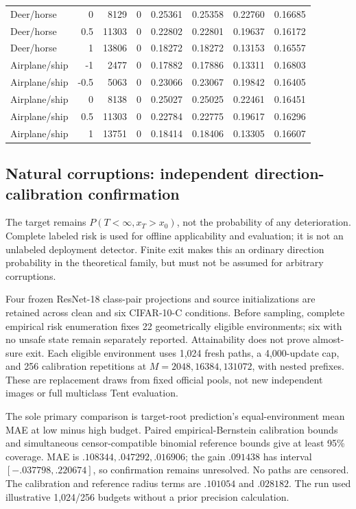 \begin{longtable}{lrrrrrrr}
Deer/horse & 0 & 8129 & 0 & 0.25361 & 0.25358 & 0.22760 & 0.16685 \\
Deer/horse & 0.5 & 11303 & 0 & 0.22802 & 0.22801 & 0.19637 & 0.16172 \\
Deer/horse & 1 & 13806 & 0 & 0.18272 & 0.18272 & 0.13153 & 0.16557 \\
Airplane/ship & -1 & 2477 & 0 & 0.17882 & 0.17886 & 0.13311 & 0.16803 \\
Airplane/ship & -0.5 & 5063 & 0 & 0.23066 & 0.23067 & 0.19842 & 0.16405 \\
Airplane/ship & 0 & 8138 & 0 & 0.25027 & 0.25025 & 0.22461 & 0.16451 \\
Airplane/ship & 0.5 & 11303 & 0 & 0.22784 & 0.22775 & 0.19617 & 0.16296 \\
Airplane/ship & 1 & 13751 & 0 & 0.18414 & 0.18406 & 0.13305 & 0.16607 \\
\bottomrule
\end{longtable}

\subsection{Natural corruptions: independent direction-calibration confirmation}
The target remains $P(T<\infty,x_T>x_0)$, not the probability of any deterioration. Complete labeled risk is used for offline applicability and evaluation; it is not an unlabeled deployment detector. Finite exit makes this an ordinary direction probability in the theoretical family, but must not be assumed for arbitrary corruptions.

Four frozen ResNet-18 class-pair projections and source initializations are retained across clean and six CIFAR-10-C conditions. Before sampling, complete empirical risk enumeration fixes 22 geometrically eligible environments; six with no unsafe state remain separately reported. Attainability does not prove almost-sure exit. Each eligible environment uses 1,024 fresh paths, a 4,000-update cap, and 256 calibration repetitions at $M=2048,16384,131072$, with nested prefixes. These are replacement draws from fixed official pools, not new independent images or full multiclass Tent evaluation.

The sole primary comparison is target-root prediction's equal-environment mean MAE at low minus high budget. Paired empirical-Bernstein calibration bounds and simultaneous censor-compatible binomial reference bounds give at least 95\% coverage. MAE is $.108344,.047292,.016906$; the gain $.091438$ has interval $[-.037798,.220674]$, so confirmation remains unresolved. No paths are censored. The calibration and reference radius terms are $.101054$ and $.028182$. The run used illustrative 1,024/256 budgets without a prior precision calculation.

